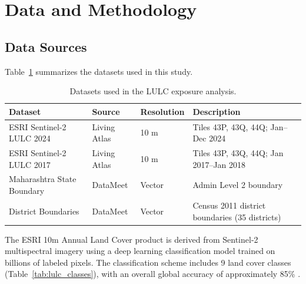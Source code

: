\documentclass[12pt,a4paper]{article}
\begin{document}
\section{Data and Methodology}

\subsection{Data Sources}

Table~\ref{tab:data_sources} summarizes the datasets used in this study.

\begin{table}[H]
\centering
\caption{Datasets used in the LULC exposure analysis.}
\label{tab:data_sources}
\begin{tabular}{p{3.5cm} p{3cm} p{3cm} p{4cm}}
\toprule
\textbf{Dataset} & \textbf{Source} & \textbf{Resolution} & \textbf{Description} \\
\midrule
ESRI Sentinel-2 LULC 2024 & Living Atlas \citep{esri2024} & 10 m & Tiles 43P, 43Q, 44Q; Jan--Dec 2024 \\
ESRI Sentinel-2 LULC 2017 & Living Atlas \citep{esri2024} & 10 m & Tiles 43P, 43Q, 44Q; Jan 2017--Jan 2018 \\
Maharashtra State Boundary & DataMeet \citep{datameet2023} & Vector & Admin Level 2 boundary \\
District Boundaries & DataMeet \citep{datameet2023} & Vector & Census 2011 district boundaries (35 districts) \\
\bottomrule
\end{tabular}
\end{table}

The ESRI 10m Annual Land Cover product is derived from Sentinel-2 multispectral imagery using a deep learning classification model trained on billions of labeled pixels. The classification scheme includes 9 land cover classes (Table~\ref{tab:lulc_classes}), with an overall global accuracy of approximately 85\% \citep{karra2021global}.
\end{document}
